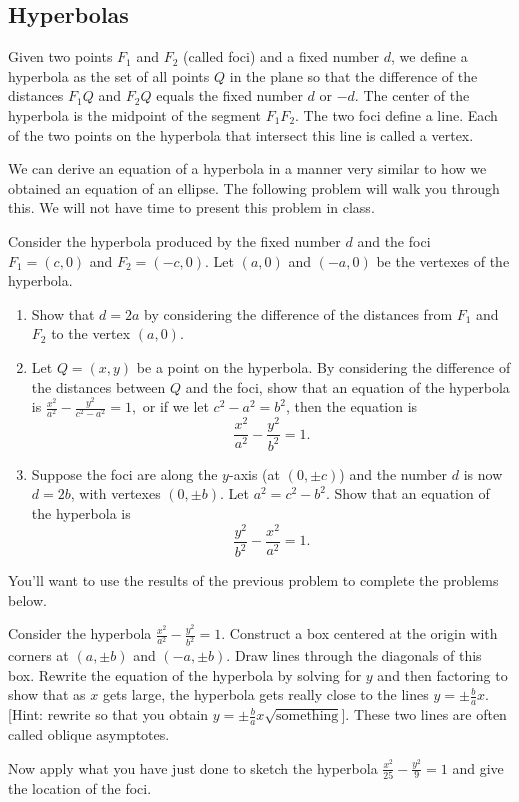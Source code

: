 \subsection{Hyperbolas}

\begin{definition}
Given two points $F_1$ and $F_2$ (called foci) and a fixed number $d$, we define a hyperbola as the set of all points $Q$ in the plane so that the difference of the distances $F_1Q$  and $F_2Q$ equals the fixed number $d$ or $-d$. The center of the hyperbola is the midpoint of the segment $F_1F_2$. The two foci define a line.  Each of the two points on the hyperbola that intersect this line is called a vertex.
\end{definition}

We can derive an equation of a hyperbola in a manner very similar to how we obtained an equation of an ellipse. The following problem will walk you through this.  We will not have time to present this problem in class.

\begin{problem*}[Optional]
Consider the hyperbola produced by the fixed number $d$ and the foci $F_1=(c,0)$ and $F_2=(-c,0)$. Let $(a,0)$ and $(-a,0)$ be the vertexes of the hyperbola.
\begin{enumerate}
\item Show that $d=2a$ by considering the difference of the distances from $F_1$ and $F_2$ to the vertex $(a,0)$.
\item Let $Q=(x,y)$ be a point on the hyperbola. By considering the difference of the distances between $Q$ and the foci, show that an equation of the hyperbola is $\frac{x^2}{a^2}-\frac{y^2}{c^2-a^2}=1,$ or if we let $c^2-a^2=b^2$, then the equation is 
$$\frac{x^2}{a^2}-\frac{y^2}{b^2}=1.$$
\item Suppose the foci are along the $y$-axis (at $(0,\pm c)$) and the number $d$ is now $d=2b$, with vertexes $(0,\pm b)$. Let $a^2=c^2-b^2$. Show that an equation of the hyperbola is $$\frac{y^2}{b^2}-\frac{x^2}{a^2}=1.$$
\end{enumerate}
\end{problem*}

You'll want to use the results of the previous problem to complete the problems below.

\begin{problem} 
Consider the hyperbola $\frac{x^2}{a^2}-\frac{y^2}{b^2}=1.$ Construct a box centered at the origin with corners at $(a, \pm b)$ and $(-a,\pm b)$.  Draw lines through the diagonals of this box. Rewrite the equation of the hyperbola by solving for $y$ and then factoring to show that as $x$ gets large, the hyperbola gets really close to the lines $y=\pm \frac{b}{a}x$. [Hint:  rewrite so that you obtain $y=\pm\frac{b}{a}x\sqrt{\text{something}}$]. These two lines are often called oblique asymptotes. 

Now apply what you have just done to sketch the hyperbola $\frac{x^2}{25}-\frac{y^2}{9}=1$ and give the location of the foci. 
\end{problem}

